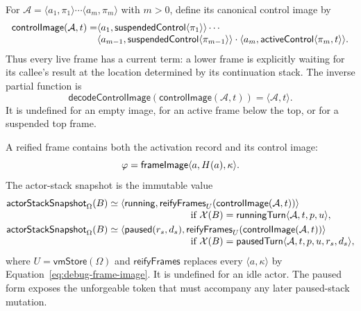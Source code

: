 For
$\mathcal A=\langle a_1,\pi_1\rangle\cdots
 \langle a_m,\pi_m\rangle$ with $m>0$, define its canonical control image by
\begin{equation}\label{eq:stack-control-image}
\begin{split}
 \mathsf{controlImage}(\mathcal A,t)=
 &\langle a_1,\mathsf{suspendedControl}\langle\pi_1\rangle\rangle\cdots\\[-1mm]
 &\langle a_{m-1},\mathsf{suspendedControl}\langle\pi_{m-1}\rangle\rangle
 \cdot\langle a_m,\mathsf{activeControl}\langle\pi_m,t\rangle\rangle.
\end{split}
\end{equation}
Thus every live frame has a current term: a lower frame is explicitly waiting
for its callee's result at the location determined by its continuation stack.
The inverse partial function is
\begin{equation}\label{eq:decode-control-image}
 \mathsf{decodeControlImage}
   (\mathsf{controlImage}(\mathcal A,t))=\langle\mathcal A,t\rangle.
\end{equation}
It is undefined for an empty image, for an active frame below the top, or for a
suspended top frame.

A reified frame contains both the activation record and its control image:
\begin{equation}\label{eq:debug-frame-image}
 \varphi=\mathsf{frameImage}\langle a,H(a),\kappa\rangle.
\end{equation}
The actor-stack snapshot is the immutable value
\begin{equation}\label{eq:actor-stack-snapshot}
\begin{split}
 \mathsf{actorStackSnapshot}_{\Omega}(B)
   &\simeq\langle\kw{running},
      \mathsf{reifyFrames}_{U}(
        \mathsf{controlImage}(\mathcal A,t))\rangle\\[-1mm]
   &\hspace{30mm}\text{if }\mathcal X(B)=
      \kw{runningTurn}\langle\mathcal A,t,p,u\rangle,\\
 \mathsf{actorStackSnapshot}_{\Omega}(B)
   &\simeq\langle\kw{paused}(r_s,d_s),
      \mathsf{reifyFrames}_{U}(
        \mathsf{controlImage}(\mathcal A,t))\rangle\\[-1mm]
   &\hspace{30mm}\text{if }\mathcal X(B)=
      \kw{pausedTurn}\langle\mathcal A,t,p,u,r_s,d_s\rangle,
\end{split}
\end{equation}
where $U=\mathsf{vmStore}(\Omega)$ and $\mathsf{reifyFrames}$ replaces every
$\langle a,\kappa\rangle$ by Equation~\eqref{eq:debug-frame-image}.  It is
undefined for an idle actor.  The paused form exposes the unforgeable token
that must accompany any later paused-stack mutation.


